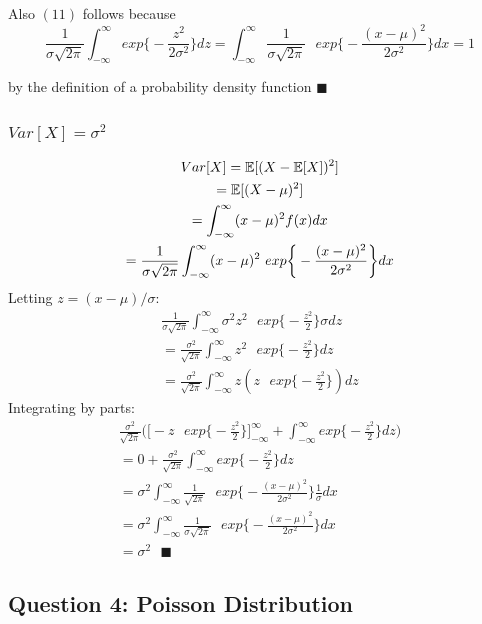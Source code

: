 \documentclass[11pt, oneside]{article}   	%
\begin{document}
Also $(11)$ follows because $$ \frac{1}{\sigma\sqrt{2\pi}} \int_{-\infty}^{\infty} exp\bigg\{- \frac{z^2}{2\sigma^2}\bigg\} dz =  \int_{-\infty}^{\infty}\frac{1}{\sigma\sqrt{2\pi}} \text{ } exp\bigg\{- \frac{(x - \mu)^2}{2\sigma^2}\bigg\} dx = 1$$

by the definition of a probability density function $\blacksquare$
\newpage{}
\subsubsection{$Var[X] = \sigma^2$}
\begin{gather*}
Var[X] = \Bbb E[(X - \Bbb E[X])^2]\\
= \Bbb E[(X - \mu)^2] \\
= \int_{-\infty}^{\infty}(x - \mu)^2f(x)dx\\
= \frac{1}{\sigma\sqrt{2\pi}} \int_{-\infty}^{\infty}(x - \mu)^2 \text{ } exp\bigg\{- \frac{(x - \mu)^2}{2\sigma^2}\bigg\} dx
\end{gather*}
Letting $z = (x - \mu)/\sigma$:
\begin{gather*}
\frac{1}{\sigma\sqrt{2\pi}} \int_{-\infty}^{\infty}\sigma^2 z^2 \text{ } exp\bigg\{- \frac{z^2}{2}\bigg\} \sigma dz\\
= \frac{\sigma^2}{\sqrt{2\pi}} \int_{-\infty}^{\infty}z^2 \text{ } exp\bigg\{- \frac{z^2}{2}\bigg\} dz\\
= \frac{\sigma^2}{\sqrt{2\pi}} \int_{-\infty}^{\infty}z (z \text{ } exp\bigg\{- \frac{z^2}{2}\bigg\}) dz
\end{gather*}
Integrating by parts:
\begin{gather*}
\frac{\sigma^2}{\sqrt{2\pi}} \bigg( \bigg[ -z \text{ }  exp\bigg\{- \frac{z^2}{2}\bigg\} \bigg]_{-\infty}^{\infty} + \int_{-\infty}^{\infty} exp\bigg\{- \frac{z^2}{2}\bigg\}dz \bigg)\\
= 0 + \frac{\sigma^2}{\sqrt{2\pi}} \int_{-\infty}^{\infty} exp\bigg\{- \frac{z^2}{2}\bigg\}dz\\
= \sigma^2 \int_{-\infty}^{\infty}\frac{1}{\sqrt{2\pi}} \text{ } exp\bigg\{- \frac{(x - \mu)^2}{2\sigma^2}\bigg\} \frac{1}{\sigma}dx\\
= \sigma^2 \int_{-\infty}^{\infty}\frac{1}{\sigma\sqrt{2\pi}} \text{ } exp\bigg\{- \frac{(x - \mu)^2}{2\sigma^2}\bigg\} dx\\
= \sigma^2 \text{ } \blacksquare
\end{gather*}

\newpage{}
\subsection{Question 4: Poisson Distribution}
\end{document}
